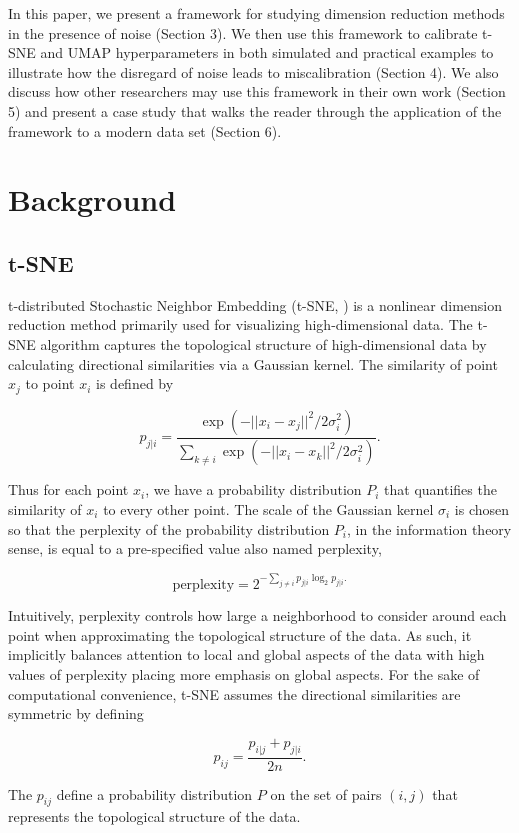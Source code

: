 \documentclass[10pt,letterpaper]{article}
\begin{document}
In this paper, we present a framework for studying dimension reduction methods in the presence of noise (Section 3). We then use this framework to calibrate t-SNE and UMAP hyperparameters in both simulated and practical examples to illustrate how the disregard of noise leads to miscalibration (Section 4). We also discuss how other researchers may use this framework in their own work (Section 5) and present a case study that walks the reader through the application of the framework to a modern data set (Section 6).

\section*{Background}

\subsection*{t-SNE}
t-distributed Stochastic Neighbor Embedding (t-SNE, \cite{t-SNE}) is a nonlinear dimension reduction method primarily used for visualizing high-dimensional data. The t-SNE algorithm captures the topological structure of high-dimensional data by calculating directional similarities via a Gaussian kernel. The similarity of point $x_j$ to point $x_i$ is defined by \begin{linenomath}$$p_{j|i} = \frac{\exp(-||x_i - x_j||^2/2\sigma_i^2)}{\sum_{k \neq i} \exp(-||x_i-x_k||^2/2\sigma_i^2)}.$$\end{linenomath} Thus for each point $x_i$, we have a probability distribution $P_i$ that quantifies the similarity of $x_i$ to every other point. The scale of the Gaussian kernel $\sigma_i$ is chosen so that the perplexity of the probability distribution $P_i$, in the information theory sense, is equal to a pre-specified value also named perplexity, \begin{linenomath}$$\textrm{perplexity} = 2^{-\sum_{j \neq i} p_{j|i}\log_2 p_{j|i}.}$$\end{linenomath} Intuitively, perplexity controls how large a neighborhood to consider around each point when approximating the topological structure of the data. As such, it implicitly balances attention to local and global aspects of the data with high values of perplexity placing more emphasis on global aspects. For the sake of computational convenience, t-SNE assumes the directional similarities are symmetric by defining \begin{linenomath}$$p_{ij} = \frac{p_{i|j} + p_{j|i}}{2n}.$$\end{linenomath} The $p_{ij}$ define a probability distribution $P$ on the set of pairs $(i,j)$ that represents the topological structure of the data.
\end{document}
